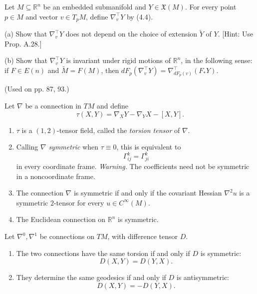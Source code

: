 \begin{exercise}
\label{prob:embedded-submanifold-covariant-derivative}
Let $M \subseteq \mathbb{R}^n$ be an embedded submanifold and $Y \in \mathfrak{X}(M)$. For every point $p \in M$ and vector $v \in T_p M$, define $\nabla_v^\top Y$ by (4.4).

(a) Show that $\nabla_v^\top Y$ does not depend on the choice of extension $\tilde{Y}$ of $Y$. [Hint: Use Prop. A.28.]

(b) Show that $\nabla_v^\top Y$ is invariant under rigid motions of $\mathbb{R}^n$, in the following sense: if $F \in E(n)$ and $\tilde{M} = F(M)$, then $dF_p(\nabla_v^\top Y) = \nabla_{dF_p(v)}^\top (F_* Y)$.

(Used on pp. 87, 93.)
\end{exercise}


\begin{proposition}
\label{prop:torsion-tensor}

Let $\nabla$ be a connection in $TM$ and define
\[
\tau(X,Y)=\nabla_XY-\nabla_YX-[X,Y].
\]
\begin{enumerate}
\item[(a)] $\tau$ is a $(1,2)$-tensor field, called the
\emph{torsion tensor} of $\nabla$.
\item[(b)] Calling $\nabla$ \emph{symmetric} when $\tau\equiv0$, this is
equivalent to
\[
\Gamma^k_{ij}=\Gamma^k_{ji}
\]
in every coordinate frame. \emph{Warning.} The coefficients need not be symmetric
in a noncoordinate frame.
\item[(c)] The connection $\nabla$ is symmetric if and only if the covariant Hessian
$\nabla^2u$ is a symmetric $2$-tensor for every $u\in C^\infty(M)$.
\item[(d)] The Euclidean connection on $\mathbb R^n$ is symmetric.
\end{enumerate}
\end{proposition}

\begin{proposition}
\label{prop:connections-difference-tensor}

Let $\nabla^0,\nabla^1$ be connections on $TM$, with difference tensor $D$.
\begin{enumerate}
\item[(a)] The two connections have the same torsion if and only if
$D$ is symmetric:
\[
D(X,Y)=D(Y,X).
\]
\item[(b)] They determine the same geodesics if and only if $D$ is
antisymmetric:
\[
D(X,Y)=-D(Y,X).
\]
\end{enumerate}
\end{proposition}

